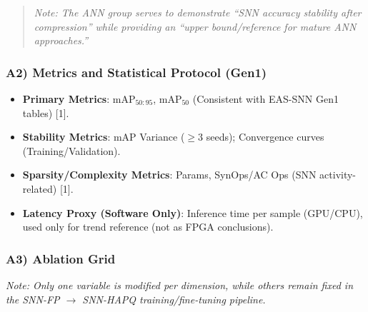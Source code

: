 \documentclass[10pt,a4paper]{article}
\begin{document}
\begin{quote}
    \textit{Note: The ANN group serves to demonstrate ``SNN accuracy stability after compression'' while providing an ``upper bound/reference for mature ANN approaches.''}
\end{quote}

\subsubsection{A2) Metrics and Statistical Protocol (Gen1)}
\begin{itemize}
    \item \textbf{Primary Metrics}: mAP$_{50:95}$, mAP$_{50}$ (Consistent with EAS-SNN Gen1 tables) [1].
    \item \textbf{Stability Metrics}: mAP Variance ($\ge 3$ seeds); Convergence curves (Training/Validation).
    \item \textbf{Sparsity/Complexity Metrics}: Params, SynOps/AC Ops (SNN activity-related) [1].
    \item \textbf{Latency Proxy (Software Only)}: Inference time per sample (GPU/CPU), used only for trend reference (not as FPGA conclusions).
\end{itemize}

\subsubsection{A3) Ablation Grid}
\textit{Note: Only one variable is modified per dimension, while others remain fixed in the SNN-FP $\to$ SNN-HAPQ training/fine-tuning pipeline.}
\end{document}
